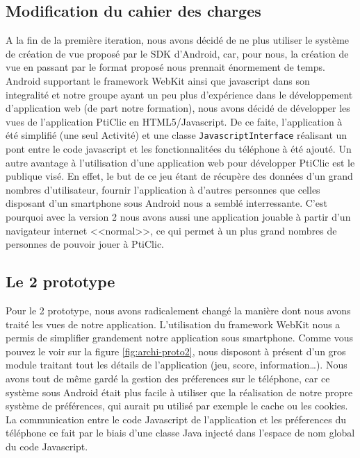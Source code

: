 \documentclass[a4paper,11pt,french]{article}
\def\android{Android\texttrademark{}}
\begin{document}
\subsection{Modification du cahier des charges}
A la fin de la première iteration, nous avons décidé de ne plus utiliser le système de création de vue proposé par le SDK d'\android{}, car,
pour nous, la création de vue en passant par le format proposé nous prennait énormement de temps. \android{} supportant le framework WebKit
ainsi que javascript dans son integralité et notre groupe ayant un peu plus d'expérience dans le développement d'application web (de part
notre formation), nous avons décidé de développer les vues de l'application PtiClic en HTML5/Javascript. De ce faite, l'application à été
simplifié (une seul Activité) et une classe \verb!JavascriptInterface! réalisant un pont entre le code javascript et les fonctionnalitées du
téléphone à été ajouté.  Un autre avantage à l'utilisation d'une application web pour développer PtiClic est le publique visé. En effet, le
but de ce jeu étant de récupère des données d'un grand nombres d'utilisateur, fournir l'application à d'autres personnes que celles
disposant d'un smartphone sous \android{} nous a semblé interressante. C'est pourquoi avec la version 2 nous avons aussi une application
jouable à partir d'un navigateur internet <<normal>>, ce qui permet à un plus grand nombres de personnes de pouvoir jouer à PtiClic.


\subsection{Le 2 prototype}
Pour le 2 prototype, nous avons radicalement changé la manière dont nous avons traité les vues de notre application. L'utilisation du framework WebKit nous a permis de simplifier grandement notre application sous smartphone.
Comme vous pouvez le voir sur la figure \ref{fig:archi-proto2}, nous disposont à présent d'un gros module traitant tout les détails de l'application (jeu, score, information\dots{}). Nous avons tout de même gardé la gestion des préferences sur le téléphone, car ce système sous \android{} était plus facile à utiliser que la réalisation de notre propre système de préférences, qui aurait pu utilisé par exemple le cache ou les cookies. %
La communication entre le code Javascript de l'application et les préferences du téléphone ce fait par le biais d'une classe Java injecté dans l'espace de nom global du code Javascript.
\end{document}
